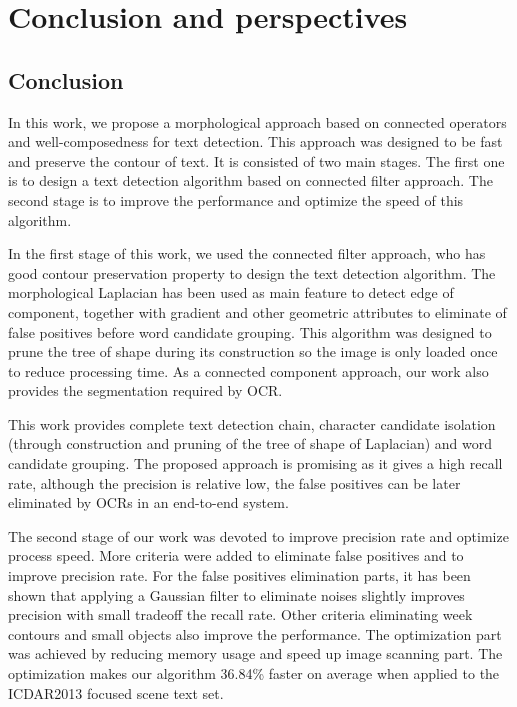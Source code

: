 
\graphicspath{ {7chapterConclusion/image/} }
\chapter{Conclusion and perspectives}

\section{Conclusion}
In this work, we propose a morphological approach based on connected operators and well-composedness for text detection. This approach was designed to be fast and preserve the contour of text. It is consisted of two main stages. The first one is to design a text detection algorithm based on connected filter approach. The second stage is to improve the performance and optimize the speed of this algorithm. 


In the first stage of this work, we used the connected filter approach, who has good contour preservation property to design the text detection algorithm. The morphological Laplacian has been used as main feature to detect edge of component, together with gradient and other geometric attributes to eliminate of false positives before word candidate grouping. This algorithm was designed to prune the tree of shape during its construction so the image is only loaded once to reduce processing time. As a connected component approach, our work also provides the segmentation required by OCR. 


This work provides complete text detection chain, character candidate isolation (through construction and pruning of the tree of shape of Laplacian) and word candidate grouping. The proposed approach is promising as it gives a high recall rate, although the precision is relative low, the false positives can be later eliminated by OCRs in an end-to-end system.
  

The second stage of our work was devoted to improve precision rate and optimize process speed. More criteria were added to eliminate false positives and to improve precision rate. For the false positives elimination parts, it has been shown that applying a Gaussian filter to eliminate noises slightly improves precision with small tradeoff the recall rate. Other criteria eliminating week contours and small objects also improve the performance. The optimization part was achieved by reducing memory usage and speed up image scanning part. The optimization makes our algorithm 36.84\% faster on average when applied to the ICDAR2013 focused scene text set. 


